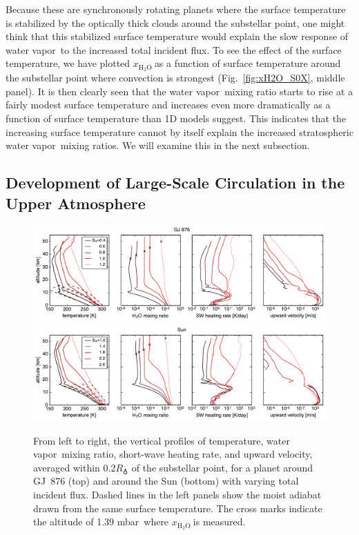 \documentclass[11pt,numberedappendix,twocolappendix,]{emulateapj}
\def\water{H$_2$O }
\def\xwater{$x_\text{\water}$}
\def\preslevel{1.39 mbar\ }
\newcommand{\wv}{water vapor\ }
\begin{document}
Because these are synchronously rotating planets where the surface temperature is stabilized by the optically thick clouds around the substellar point, one might think that this stabilized surface temperature would explain the slow  response of \wv to the increased total incident flux. 
To see the effect of the surface temperature, we have plotted \xwater as a function of surface temperature around the substellar point where convection is strongest (Fig.~\ref{fig:xH2O_S0X}, middle panel). 
It is then clearly seen that the \wv mixing ratio starts to rise at a fairly modest surface temperature and increases even more dramatically as a function of surface temperature than 1D models suggest. 
This indicates that the increasing surface temperature cannot by itself explain the increased stratospheric \wv mixing ratios. 
We will examine this in the next subsection. 

\subsection{Development of Large-Scale Circulation in the Upper Atmosphere}
\label{ss:result_omega}


\begin{figure}[htb]
    \begin{center}
    \includegraphics[width=1\hsize]{fig/AqOH0TLS_GJ876_temp_xH2O_vz_heat.pdf}
    \includegraphics[width=1\hsize]{fig/AqOH0TLS_Sun_temp_xH2O_vz_heat.pdf}
    \end{center}
\caption{From left to right, the vertical profiles of temperature, \wv mixing ratio, short-wave heating rate, and upward velocity, averaged within $0.2R_\earth$ of the substellar point, for a planet around GJ~876 (top) and around the Sun (bottom) with varying total incident flux. Dashed lines in the left panels show the moist adiabat drawn from the same surface temperature. The cross marks indicate the altitude of \preslevel where \xwater is measured. }
\label{fig:AqOH0TLS_GJ876_temp_xH2O_vz_heat}
\end{figure}
\end{document}

